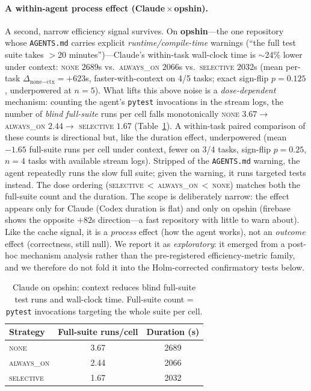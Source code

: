 \documentclass[11pt]{article}
\newcommand{\agentsmd}{\texttt{AGENTS.md}}
\newcommand{\none}{\textsc{none}}
\newcommand{\alwayson}{\textsc{always\_on}}
\newcommand{\selective}{\textsc{selective}}
\begin{document}
\paragraph{A within-agent process effect (Claude\,$\times$\,opshin).}
A second, narrow efficiency signal survives. On \textbf{opshin}---the one repository whose \agentsmd{} carries explicit \emph{runtime/compile-time} warnings (``the full test suite takes $>$20 minutes'')---Claude's within-task wall-clock time is ${\sim}$24\% lower under context: \none{} $2689$s vs.\ \alwayson{} $2066$s vs.\ \selective{} $2032$s (mean per-task $\Delta_{\text{none}-\text{ctx}}{=}{+}623$s, faster-with-context on 4/5 tasks; exact sign-flip $p{=}0.125$, underpowered at $n{=}5$).
What lifts this above noise is a \emph{dose-dependent} mechanism: counting the agent's \texttt{pytest} invocations in the stream logs, the number of \emph{blind full-suite} runs per cell falls monotonically \none{} $3.67 \to$ \alwayson{} $2.44 \to$ \selective{} $1.67$ (Table~\ref{tab:opshin}).
A within-task paired comparison of these counts is directional but, like the duration effect, underpowered (mean ${-}1.65$ full-suite runs per cell under context, fewer on 3/4 tasks, sign-flip $p{=}0.25$, $n{=}4$ tasks with available stream logs).
Stripped of the \agentsmd{} warning, the agent repeatedly runs the slow full suite; given the warning, it runs targeted tests instead.
The dose ordering (\selective{}\,$<$\,\alwayson{}\,$<$\,\none{}) matches both the full-suite count and the duration.
The scope is deliberately narrow: the effect appears only for Claude (Codex duration is flat) and only on opshin (firebase shows the opposite ${+}82$s direction---a fast repository with little to warn about).
Like the cache signal, it is a \emph{process} effect (how the agent works), not an \emph{outcome} effect (correctness, still null).
We report it as \emph{exploratory}: it emerged from a post-hoc mechanism analysis rather than the pre-registered efficiency-metric family, and we therefore do not fold it into the Holm-corrected confirmatory tests below.

\begin{table}[t]
\centering
\small
\caption{Claude on opshin: context reduces blind full-suite test runs and wall-clock time. Full-suite count = \texttt{pytest} invocations targeting the whole suite per cell.}
\label{tab:opshin}
\begin{tabular}{lcc}
\toprule
\textbf{Strategy} & \textbf{Full-suite runs/cell} & \textbf{Duration (s)} \\
\midrule
\none      & 3.67 & 2689 \\
\alwayson  & 2.44 & 2066 \\
\selective & 1.67 & 2032 \\
\bottomrule
\end{tabular}
\end{table}
\end{document}
